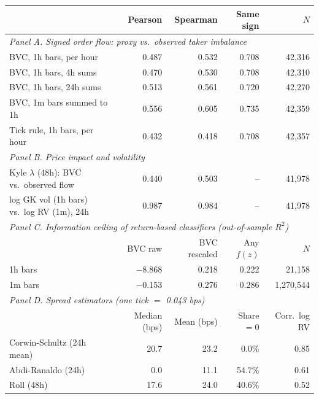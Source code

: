 \begin{tabular}{lrrrr}
\toprule
 & Pearson & Spearman & Same sign & $N$\\
\midrule
\multicolumn{5}{l}{\emph{Panel A. Signed order flow: proxy vs.\ observed taker imbalance}}\\
BVC, 1h bars, per hour & 0.487 & 0.532 & 0.708 & 42,316\\
BVC, 1h bars, 4h sums & 0.470 & 0.530 & 0.708 & 42,310\\
BVC, 1h bars, 24h sums & 0.513 & 0.561 & 0.720 & 42,270\\
BVC, 1m bars summed to 1h & 0.556 & 0.605 & 0.735 & 42,359\\
Tick rule, 1h bars, per hour & 0.432 & 0.418 & 0.708 & 42,357\\
\midrule
\multicolumn{5}{l}{\emph{Panel B. Price impact and volatility}}\\
Kyle $\lambda$ (48h): BVC vs.\ observed flow & 0.440 & 0.503 & -- & 41,978\\
log GK vol (1h bars) vs.\ log RV (1m), 24h & 0.987 & 0.984 & -- & 41,978\\
\midrule
\multicolumn{5}{l}{\emph{Panel C. Information ceiling of return-based classifiers (out-of-sample $R^2$)}}\\
 & BVC raw & BVC rescaled & Any $f(z)$ & $N$\\
1h bars & \ensuremath{-}8.868 & 0.218 & 0.222 & 21,158\\
1m bars & \ensuremath{-}0.153 & 0.276 & 0.286 & 1,270,544\\
\midrule
\multicolumn{5}{l}{\emph{Panel D. Spread estimators (one tick $=$ 0.043 bps)}}\\
 & Median (bps) & Mean (bps) & Share $=0$ & Corr.\ log RV\\
Corwin-Schultz (24h mean) & 20.7 & 23.2 & 0.0\% & 0.85\\
Abdi-Ranaldo (24h) & 0.0 & 11.1 & 54.7\% & 0.61\\
Roll (48h) & 17.6 & 24.0 & 40.6\% & 0.52\\
\bottomrule
\end{tabular}

